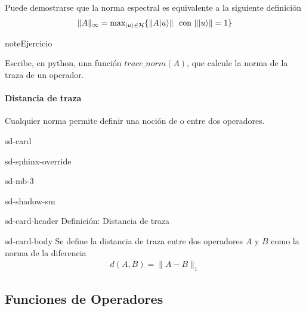 \documentclass[letterpaper,10pt,english]{jupyterBook}
\newcommand{\ket}[1]{|#1\rangle}
\newcommand{\Hil}{{\cal H}}
\begin{document}
\sphinxAtStartPar
Puede demostrarse que la norma espectral es equivalente a la siguiente definición
\begin{equation*}
\begin{split}
\|A\|_\infty = \hbox{max}_{\ket{u}\in \Hil}\{ \|A\ket{u}\| ~~\hbox{con} ~ \|\ket{u}\| = 1\}
\end{split}
\end{equation*}
\begin{sphinxadmonition}{note}{Ejercicio}

\sphinxAtStartPar
Escribe, en python, una función \(trace\_norm(A)\), que calcule la norma de la traza de un operador.
\end{sphinxadmonition}


\paragraph{Distancia de traza}
\label{\detokenize{docs/Part_01_Formalismo/Chapter_01_02_Formalismo_matem_xe1tico/01_03_Operadores_myst:distancia-de-traza}}
\sphinxAtStartPar
Cualquier norma permite definir una noción de  o  entre dos operadores.

\begin{sphinxuseclass}{sd-card}
\begin{sphinxuseclass}{sd-sphinx-override}
\begin{sphinxuseclass}{sd-mb-3}
\begin{sphinxuseclass}{sd-shadow-sm}
\begin{sphinxuseclass}{sd-card-header}
\sphinxAtStartPar
Definición: Distancia de traza

\end{sphinxuseclass}
\begin{sphinxuseclass}{sd-card-body}
\sphinxAtStartPar
Se define la   distancia de traza entre dos operadores \(A\) y \(B\) como la norma de la diferencia
\begin{equation*}
\begin{split}
d(A,B) = \| A - B \|_1 
\end{split}
\end{equation*}
\end{sphinxuseclass}
\end{sphinxuseclass}
\end{sphinxuseclass}
\end{sphinxuseclass}
\end{sphinxuseclass}

\subsection{Funciones de Operadores}
\label{\detokenize{docs/Part_01_Formalismo/Chapter_01_02_Formalismo_matem_xe1tico/01_03_Operadores_myst:funciones-de-operadores}}
\end{document}
